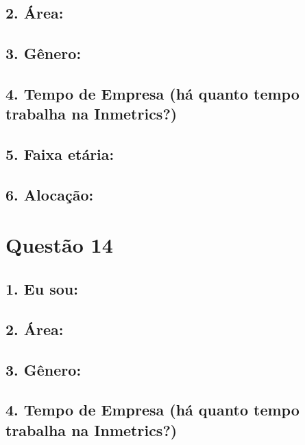 \documentclass[]{book}
\begin{document}
\hypertarget{area-10}{%
\subsection{2. Área:}\label{area-10}}

\hypertarget{genero-10}{%
\subsection{3. Gênero:}\label{genero-10}}

\hypertarget{tempo-de-empresa-ha-quanto-tempo-trabalha-na-inmetrics-10}{%
\subsection{4. Tempo de Empresa (há quanto tempo trabalha na Inmetrics?)}\label{tempo-de-empresa-ha-quanto-tempo-trabalha-na-inmetrics-10}}

\hypertarget{faixa-etaria-10}{%
\subsection{5. Faixa etária:}\label{faixa-etaria-10}}

\hypertarget{alocacao-10}{%
\subsection{6. Alocação:}\label{alocacao-10}}

\hypertarget{questao-14}{%
\section{Questão 14}\label{questao-14}}

\hypertarget{eu-sou-11}{%
\subsection{1. Eu sou:}\label{eu-sou-11}}

\hypertarget{area-11}{%
\subsection{2. Área:}\label{area-11}}

\hypertarget{genero-11}{%
\subsection{3. Gênero:}\label{genero-11}}

\hypertarget{tempo-de-empresa-ha-quanto-tempo-trabalha-na-inmetrics-11}{%
\subsection{4. Tempo de Empresa (há quanto tempo trabalha na Inmetrics?)}\label{tempo-de-empresa-ha-quanto-tempo-trabalha-na-inmetrics-11}}
\end{document}
